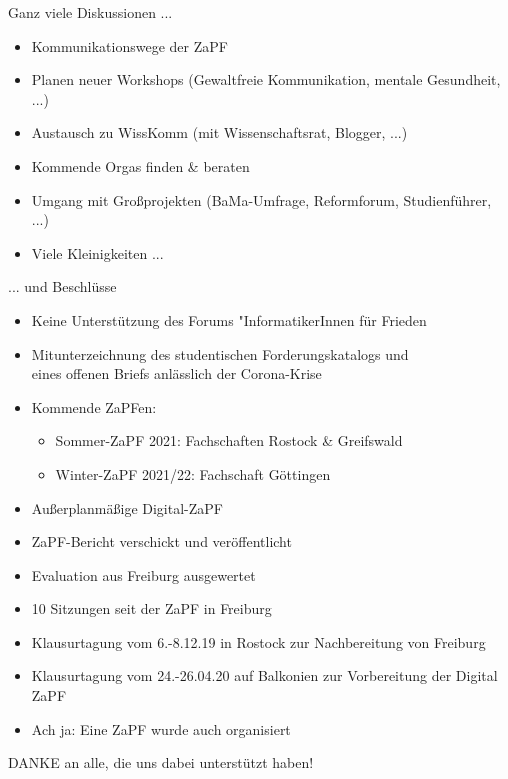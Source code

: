 \documentclass[compress, aspectratio=169]{beamer}
\begin{document}
\begin{frame}{Ganz viele Diskussionen ...}
  \begin{itemize}
    \item Kommunikationswege der ZaPF
    \item Planen neuer Workshops (Gewaltfreie Kommunikation, mentale Gesundheit, ...)
    \item Austausch zu WissKomm (mit Wissenschaftsrat, Blogger, ...)
    \item Kommende Orgas finden \& beraten
    \item Umgang mit Großprojekten (BaMa-Umfrage, Reformforum, Studienführer, ...)
    \item Viele Kleinigkeiten ...
  \end{itemize}
\end{frame}

\begin{frame}{... und Beschlüsse}
  \begin{itemize}
    \item Keine Unterstützung des Forums "InformatikerInnen für Frieden
    \item Mitunterzeichnung des studentischen Forderungskatalogs und \\
      eines offenen Briefs anlässlich der Corona-Krise
    \item Kommende ZaPFen:
    \begin{itemize}
      \item Sommer-ZaPF 2021: Fachschaften Rostock \& Greifswald
      \item Winter-ZaPF 2021/22: Fachschaft Göttingen
    \end{itemize}
    \item Außerplanmäßige Digital-ZaPF
  \end{itemize}
\end{frame}

\begin{frame}
  \begin{itemize}
    \item ZaPF-Bericht verschickt und veröffentlicht
    \item Evaluation aus Freiburg ausgewertet
    \item 10 Sitzungen seit der ZaPF in Freiburg
    \item Klausurtagung vom 6.-8.12.19 in Rostock zur Nachbereitung von Freiburg
    \item Klausurtagung vom 24.-26.04.20 auf Balkonien zur Vorbereitung der Digital ZaPF
    \item Ach ja: Eine ZaPF wurde auch organisiert
  \end{itemize}
  \vspace{5mm}
  \begin{center}
    \Large DANKE an alle, die uns dabei unterstützt haben!
  \end{center}
\end{frame}
\end{document}
